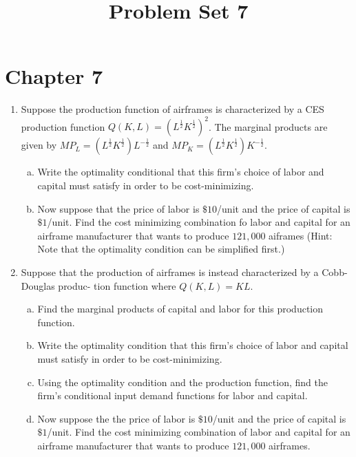 \documentclass[11pt]{article}
\title{Problem Set 7}
\begin{document}
  
\section*{Chapter 7}

\begin{enumerate}
  \item Suppose the production function of airframes is characterized by a CES production function $Q(K, L) = (L^{\frac{1}{2}} K^{\frac{1}{2}})^2$. The marginal products are given by $MP_L = (L^{\frac{1}{2}} K^{\frac{1}{2}}) L^{-\frac{1}{2}}$ and $MP_K = (L^{\frac{1}{2}} K^{\frac{1}{2}}) K^{-\frac{1}{2}}$.

  \begin{enumerate}[(a)]
    \item Write the optimality conditional that this firm's choice of labor and capital must satisfy in order to be cost-minimizing. 
    
    \vspace*{40mm}
    \item Now suppose that the price of labor is $\$10$/unit and the price of capital is $\$1$/unit. Find the cost minimizing combination fo labor and capital for an airframe manufacturer that wants to produce $121,000$ aiframes (Hint: Note that the optimality condition can be simplified first.)
  \end{enumerate}


  \newpage
  \item Suppose that the production of airframes is instead characterized by a Cobb-Douglas produc- tion function where $Q(K, L) = KL$.
  
  \begin{enumerate}[(a)]
    \item Find the marginal products of capital and labor for this production function.
    

    \vspace*{40mm}
    \item Write the optimality condition that this firm’s choice of labor and capital must satisfy in order to be cost-minimizing.
    
    \vspace*{40mm}
    \item Using the optimality condition and the production function, find the firm’s conditional input demand functions for labor and capital.
    

    \newpage
    \item Now suppose the the price of labor is $\$10$/unit and the price of capital is $\$1$/unit. Find the cost minimizing combination of labor and capital for an airframe manufacturer that wants to produce $121,000$ airframes.
  \end{enumerate}


\end{enumerate}
\end{document}
